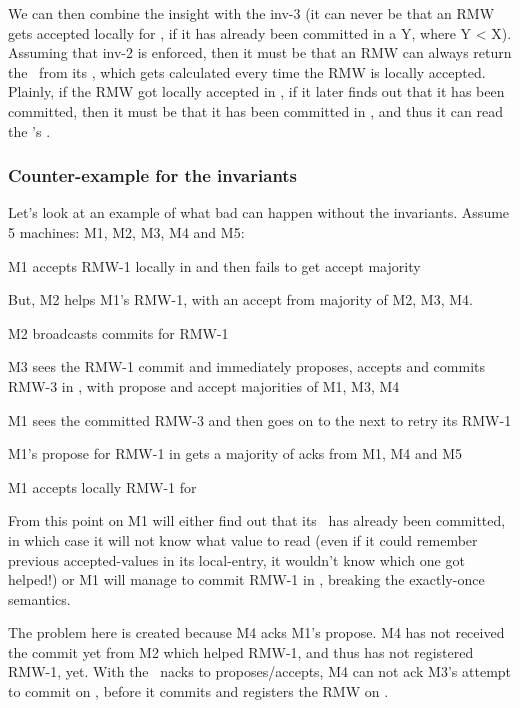 We can then combine the insight with the inv-3 (\ie it can never be that an RMW gets accepted locally for \lognox, if it has already been committed in a \lognoeq Y, where Y < X).
Assuming that inv-2 is enforced, then it must be that an RMW can always return the \accval\ from its \locentry, which gets calculated every time the RMW is locally accepted. Plainly, if the RMW got locally accepted in \lognox, if it later finds out that it has been committed, then it must be that it has been committed in \lognox, and thus it can read the \locentry's \accval.


\subsubsection{Counter-example for the invariants}

Let's look at an example of what bad can happen without the invariants. Assume 5 machines: M1, M2, M3, M4 and M5:
\squishenum
\item M1 accepts RMW-1 locally in  and then fails to get accept majority
\item But, M2 helps M1's RMW-1, with an accept from majority of M2, M3, M4.
\item M2 broadcasts commits for RMW-1
\item M3 sees the RMW-1 commit and immediately proposes, accepts and commits RMW-3 in , with propose and accept majorities of M1, M3, M4
\item M1 sees the committed RMW-3 and then goes on to the next  to retry its RMW-1
\item M1's propose  for RMW-1 in  gets a majority of acks from M1, M4 and M5
\item M1 accepts locally RMW-1 for 
\squishenumend

\custvspace \noindent
From this point on M1 will either find out that its \RMW\ has already been committed, in which case it will not know what value to read (even if it could remember previous accepted-values in its local-entry, it wouldn't know which one got helped!) or M1 will manage to commit RMW-1 in , breaking the exactly-once semantics.

The problem here is created because M4 acks M1's propose. M4 has not received the commit yet from M2 which helped RMW-1, and thus has not registered RMW-1, yet.
With the \loghigh~nacks to proposes/accepts, M4 can not ack M3's attempt to commit on , before it commits and registers the RMW on . 






